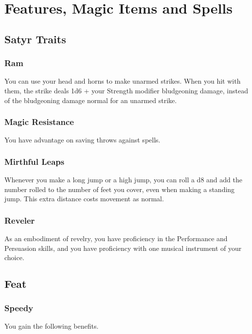 \documentclass[letterpaper,openany,oneside,twocolumn]{book}
\begin{document}
\onecolumn


\rendercharactersheet

\renderbackgroundsheet

\renderspellsheet


\restoregeometry
\twocolumn

\chapter*{Features, Magic Items and Spells}

\section*{Satyr Traits}
\subsection*{Ram}
You can use your head and horns to make unarmed strikes. When you hit with them, the strike deals 1d6 + your Strength modifier bludgeoning damage, instead of the bludgeoning damage normal for an unarmed strike.
\subsection*{Magic Resistance}
You have advantage on saving throws against spells.
\subsection*{Mirthful Leaps}
Whenever you make a long jump or a high jump, you can roll a d8 and add the number rolled to the number of feet you cover, even when making a standing jump. This extra distance costs movement as normal.
\subsection*{Reveler}
As an embodiment of revelry, you have proficiency in the Performance and Persuasion skills, and you have proficiency with one musical instrument of your choice.

\section*{Feat}
\subsection*{Speedy}
You gain the following benefits.
\end{document}

